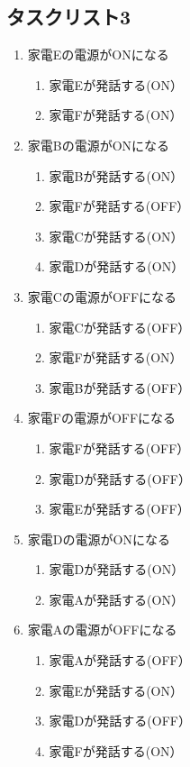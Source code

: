 \documentclass[a4j,12pt,twoside]{jreport}
\begin{document}
\subsection*{タスクリスト3}
\begin{multicols}{2}
	\begin{enumerate}
		\item 家電Eの電源がONになる
		\begin{enumerate}
			\item 家電Eが発話する(ON）
			\item 家電Fが発話する(ON）
		\end{enumerate}
		
		\item 家電Bの電源がONになる
		\begin{enumerate}
			\item 家電Bが発話する(ON）
			\item 家電Fが発話する(OFF）
			\item 家電Cが発話する(ON）
			\item 家電Dが発話する(ON）
		\end{enumerate}	
			
		\item 家電Cの電源がOFFになる
		\begin{enumerate}
			\item 家電Cが発話する(OFF）
			\item 家電Fが発話する(ON）
			\item 家電Bが発話する(OFF）
		\end{enumerate}
	
		\item 家電Fの電源がOFFになる
		\begin{enumerate}	
			\item 家電Fが発話する(OFF）	
			\item 家電Dが発話する(OFF）
			\item 家電Eが発話する(OFF）
		\end{enumerate}
		
		\item 家電Dの電源がONになる
		\begin{enumerate}
			\item 家電Dが発話する(ON）
			\item 家電Aが発話する(ON）
		\end{enumerate}	
		
		\item 家電Aの電源がOFFになる
		\begin{enumerate}
			\item 家電Aが発話する(OFF）
			\item 家電Eが発話する(ON）
			\item 家電Dが発話する(OFF）
			\item 家電Fが発話する(ON）	
		\end{enumerate}	
		

\end{enumerate}
\end{multicols}
\end{document}
